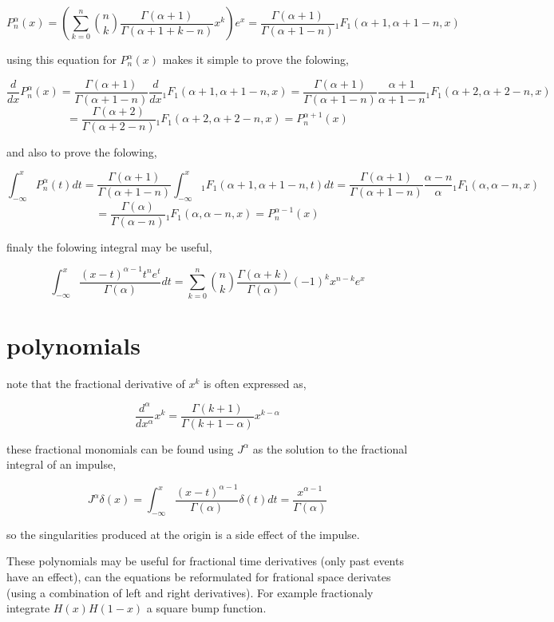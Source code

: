\documentclass[%
 preprint,
 amsmath, amssymb, aps, pra, 10pt
]{revtex4-2}
\begin{document}
\[P_n^\alpha(x) = \left( \sum_{k=0}^n \binom{n}{k}\frac{\Gamma(\alpha + 1)}{\Gamma(\alpha + 1 + k - n)}x^k \right)e^x = \frac{\Gamma(\alpha + 1)}{\Gamma(\alpha + 1 -n)}{}_1F_1(\alpha + 1, \alpha + 1 -n, x)\]

using this equation for $P_n^\alpha(x)$ makes it simple to prove the folowing,

\[\frac{d}{dx}P_n^\alpha(x) = \frac{\Gamma(\alpha + 1)}{\Gamma(\alpha + 1 -n)}\frac{d}{dx}{}_1F_1(\alpha + 1, \alpha + 1 -n, x) = \frac{\Gamma(\alpha + 1)}{\Gamma(\alpha + 1 -n)}\frac{\alpha + 1}{\alpha + 1 - n}{}_1F_1(\alpha + 2, \alpha + 2 -n, x) \]\[= \frac{\Gamma(\alpha + 2)}{\Gamma(\alpha + 2 -n)}{}_1F_1(\alpha + 2, \alpha + 2 -n, x) = P_n^{\alpha + 1}(x)\]

and also to prove the folowing,

\[\int_{-\infty}^x P_n^\alpha(t)dt = \frac{\Gamma(\alpha + 1)}{\Gamma(\alpha + 1 -n)} \int_{-\infty}^x  {}_1F_1(\alpha + 1, \alpha + 1 -n, t)dt = \frac{\Gamma(\alpha + 1)}{\Gamma(\alpha + 1 -n)}\frac{\alpha - n}{\alpha}{}_1F_1(\alpha, \alpha -n, x) \]\[= \frac{\Gamma(\alpha)}{\Gamma(\alpha - n)}{}_1F_1(\alpha, \alpha - n, x) = P_n^{\alpha - 1}(x)\]

finaly the folowing integral may be useful,

\[\int_{-\infty}^x \frac{\left(x - t\right)^{\alpha - 1}t^ne^t}{\Gamma(\alpha)}dt = \sum_{k=0}^n \binom{n}{k}\frac{\Gamma(\alpha + k)}{\Gamma(\alpha)}(-1)^kx^{n - k}e^x\]

\section{polynomials}
note that the fractional derivative of $x^k$ is often expressed as,

\[\frac{d^\alpha}{dx^\alpha}x^k = \frac{\Gamma(k + 1)}{\Gamma(k + 1 - \alpha)}x^{k - \alpha}\]

these fractional monomials can be found using $J^\alpha$ as the solution to the fractional integral of an impulse,

\[J^\alpha\delta(x) = \int_{-\infty}^x \frac{\left(x - t\right)^{\alpha - 1}}{\Gamma(\alpha)}\delta(t)dt = \frac{x^{\alpha - 1}}{\Gamma(\alpha)}\]

so the singularities produced at the origin is a side effect of the impulse.

These polynomials may be useful for fractional time derivatives (only past events have an effect), can the equations be reformulated for frational space derivates (using a combination of left and right derivatives). For example fractionaly integrate $H(x)H(1-x)$ a square bump function.
\end{document}
